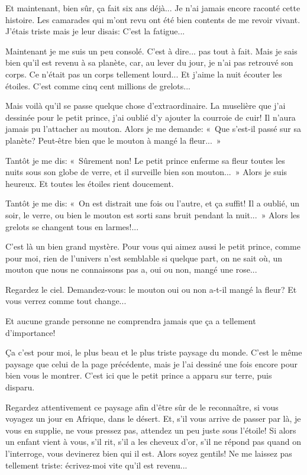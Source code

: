 \documentclass[a4paper]{report}
\begin{document}

\parachapter[XXVII]{} %

Et maintenant, bien sûr, ça fait six ans déjà... Je n'ai jamais encore raconté cette histoire. Les camarades qui m'ont revu ont été bien contents de me revoir vivant. J'étais triste mais je leur disais: C'est la fatigue...

Maintenant je me suis un peu consolé. C'est à dire... pas tout à fait. Mais je sais bien qu'il est revenu à sa planète, car, au lever du jour, je n'ai pas retrouvé son corps. Ce n'était pas un corps tellement lourd... Et j'aime la nuit écouter les étoiles. C'est comme cinq cent millions de grelots...

Mais voilà qu'il se passe quelque chose d'extraordinaire. La muselière que j'ai dessinée pour le petit prince, j'ai oublié d'y ajouter la courroie de cuir! Il n'aura jamais pu l'attacher au mouton. Alors je me demande: «~Que s'est-il passé sur sa planète? Peut-être bien que le mouton à mangé la fleur...~»

Tantôt je me dis: «~Sûrement non! Le petit prince enferme sa fleur toutes les nuits sous son globe de verre, et il surveille bien son mouton...~» Alors je suis heureux. Et toutes les étoiles rient doucement.

Tantôt je me dis: «~On est distrait une fois ou l'autre, et ça suffit! Il a oublié, un soir, le verre, ou bien le mouton est sorti sans bruit pendant la nuit...~» Alors les grelots se changent tous en larmes!...

C'est là un bien grand mystère. Pour vous qui aimez aussi le petit prince, comme pour moi, rien de l'univers n'est semblable si quelque part, on ne sait où, un mouton que nous ne connaissons pas a, oui ou non, mangé une rose...

Regardez le ciel. Demandez-vous: le mouton oui ou non a-t-il mangé la fleur? Et vous verrez comme tout change...

Et aucune grande personne ne comprendra jamais que ça a tellement d'importance!


Ça c'est pour moi, le plus beau et le plus triste paysage du monde. C'est le même paysage que celui de la page précédente, mais je l'ai dessiné une fois encore pour bien vous le montrer. C'est ici que le petit prince a apparu sur terre, puis disparu.

Regardez attentivement ce paysage afin d'être sûr de le reconnaître, si vous voyagez un jour en Afrique, dans le désert. Et, s'il vous arrive de passer par là, je vous en supplie, ne vous pressez pas, attendez un peu juste sous l'étoile! Si alors un enfant vient à vous, s'il rit, s'il a les cheveux d'or, s'il ne répond pas quand on l'interroge, vous devinerez bien qui il est. Alors soyez gentils! Ne me laissez pas tellement triste: écrivez-moi vite qu'il est revenu...
\end{document}
